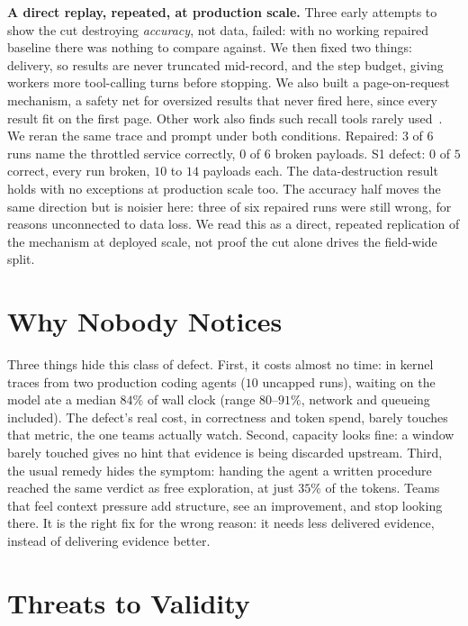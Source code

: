 \documentclass[10pt,conference]{IEEEtran}
\begin{document}
\textbf{A direct replay, repeated, at production scale.} Three early
attempts to show the cut destroying \emph{accuracy}, not data, failed:
with no working repaired baseline there was nothing to compare against.
We then fixed two things: delivery, so results are never truncated
mid-record, and the step budget, giving workers more tool-calling turns
before stopping. We also built a page-on-request mechanism, a safety net
for oversized results that never fired here, since every result fit on
the first page. Other work also finds such recall tools rarely
used~\cite{fan2026harnessdesign}. We reran the same trace and prompt under both
conditions. Repaired: $3$
of $6$ runs name the throttled service correctly, $0$ of $6$ broken
payloads. S1 defect: $0$ of $5$ correct, every run broken, $10$ to $14$
payloads each. The data-destruction result holds with no exceptions at
production scale too. The accuracy half moves the same direction but is
noisier here: three of six repaired runs were still wrong, for reasons
unconnected to data loss. We read this as a direct, repeated replication
of the mechanism at deployed scale, not proof the cut alone drives the
field-wide split.

\section{Why Nobody Notices}
\label{sec:unnoticed}

Three things hide this class of defect. First, it costs almost no time:
in kernel traces from two production coding agents ($10$ uncapped runs),
waiting on the model ate a median $84\%$ of wall clock (range
$80$--$91\%$, network and queueing included). The defect's real cost, in
correctness and token spend, barely touches that metric, the one teams
actually watch. Second, capacity looks fine: a window barely touched
gives no hint that evidence is being discarded upstream. Third, the
usual remedy hides the symptom: handing the agent a written procedure
reached the same verdict as free exploration, at just $35\%$ of the
tokens. Teams that feel context pressure add
structure, see an improvement, and stop looking there. It is the right
fix for the wrong reason: it needs less delivered evidence, instead of
delivering evidence better.

\section{Threats to Validity}
\end{document}

